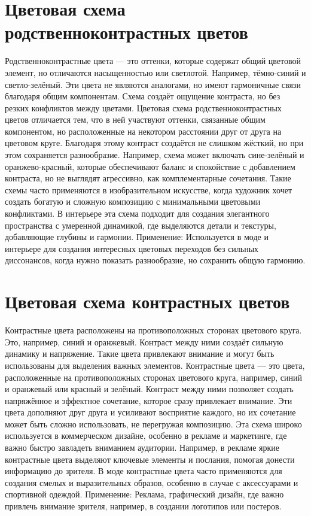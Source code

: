 \documentclass[bachelor, och, referat]{SCWorks}
\begin{document}
\section{Цветовая схема родственноконтрастных цветов}
Родственноконтрастные цвета — это оттенки, которые содержат общий цветовой элемент, но отличаются насыщенностью или светлотой. Например, тёмно-синий и светло-зелёный. Эти цвета не являются аналогами, но имеют гармоничные связи благодаря общим компонентам. Схема создаёт ощущение контраста, но без резких конфликтов между цветами.
Цветовая схема родственноконтрастных цветов отличается тем, что в ней участвуют оттенки, связанные общим компонентом, но расположенные на некотором расстоянии друг от друга на цветовом круге. Благодаря этому контраст создаётся не слишком жёсткий, но при этом сохраняется разнообразие. Например, схема может включать сине-зелёный и оранжево-красный, которые обеспечивают баланс и спокойствие с добавлением контраста, но не выглядят агрессивно, как комплементарные сочетания.
Такие схемы часто применяются в изобразительном искусстве, когда художник хочет создать богатую и сложную композицию с минимальными цветовыми конфликтами. В интерьере эта схема подходит для создания элегантного пространства с умеренной динамикой, где выделяются детали и текстуры, добавляющие глубины и гармонии.
Применение: Используется в моде и интерьере для создания интересных цветовых переходов без сильных диссонансов, когда нужно показать разнообразие, но сохранить общую гармонию.

\section{Цветовая схема контрастных цветов}
Контрастные цвета расположены на противоположных сторонах цветового круга. Это, например, синий и оранжевый. Контраст между ними создаёт сильную динамику и напряжение. Такие цвета привлекают внимание и могут быть использованы для выделения важных элементов.
Контрастные цвета — это цвета, расположенные на противоположных сторонах цветового круга, например, синий и оранжевый или красный и зелёный. Контраст между ними позволяет создать напряжённое и эффектное сочетание, которое сразу привлекает внимание. Эти цвета дополняют друг друга и усиливают восприятие каждого, но их сочетание может быть сложно использовать, не перегружая композицию.
Эта схема широко используется в коммерческом дизайне, особенно в рекламе и маркетинге, где важно быстро завладеть вниманием аудитории. Например, в рекламе яркие контрастные цвета выделяют ключевые элементы и послания, помогая донести информацию до зрителя. В моде контрастные цвета часто применяются для создания смелых и выразительных образов, особенно в случае с аксессуарами и спортивной одеждой.
Применение: Реклама, графический дизайн, где важно привлечь внимание зрителя, например, в создании логотипов или постеров.
\end{document}
